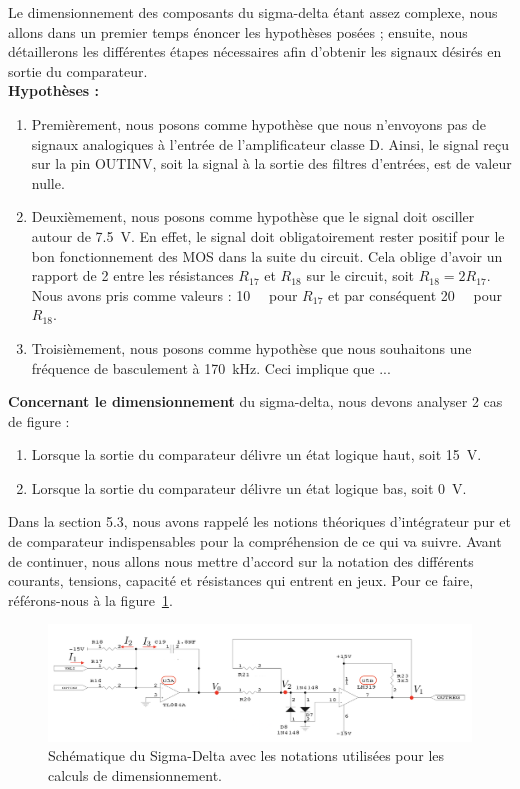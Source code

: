 \documentclass[10pt, oneside, a4paper]{article}
\begin{document}
Le dimensionnement des composants du sigma-delta étant assez complexe, nous allons dans un premier temps énoncer les hypothèses posées ; ensuite, nous détaillerons les différentes étapes nécessaires afin d'obtenir les signaux désirés en sortie du comparateur. \\[1ex]
\textbf{Hypothèses :}
\begin{enumerate}
    \item Premièrement, nous posons comme hypothèse que nous n'envoyons pas de signaux
        analogiques à l'entrée de l'amplificateur classe D.
        Ainsi, le signal reçu sur la pin OUTINV, soit la signal à la sortie des filtres
        d'entrées, est de valeur nulle.
    \item Deuxièmement, nous posons comme hypothèse que le signal doit osciller autour
        de \SI{7.5}{\volt}.
        En effet, le signal doit obligatoirement rester positif pour le bon fonctionnement
        des MOS dans la suite du circuit.
        Cela oblige d'avoir un rapport de 2 entre les résistances $R_{17}$ et $R_{18}$ sur
        le circuit, soit $R_{18} = 2R_{17}$.
        Nous avons pris comme valeurs : \SI{10}{\kilo\Omega} pour $R_{17}$ et par
        conséquent \SI{20}{\kilo\Omega} pour $R_{18}$.
    \item Troisièmement, nous posons comme hypothèse que nous souhaitons une fréquence de
        basculement à \SI{170}{\kilo\hertz}.
        Ceci implique que ...
\end{enumerate}

\noindent\textbf{Concernant le dimensionnement} du sigma-delta, nous devons analyser 2 cas de figure : 
\begin{enumerate}
\item Lorsque la sortie du comparateur délivre un état logique haut, soit \SI{15}{\volt}.
\item Lorsque la sortie du comparateur délivre un état logique bas, soit \SI{0}{\volt}.
\end{enumerate}


Dans la section 5.3, nous avons rappelé les notions théoriques d'intégrateur pur et de comparateur indispensables pour la compréhension de ce qui va suivre. Avant de continuer, nous allons nous mettre d'accord sur la notation des différents courants, tensions, capacité et résistances qui entrent en jeux. Pour ce faire, référons-nous à la figure~\ref{fig:notation}. \\
\begin{figure}[!ht]
    \centering
    \includegraphics[width=\textwidth]{image/Sigma_Delta_Notation.png}
    \caption{Schématique du Sigma-Delta avec les notations utilisées pour les calculs de dimensionnement.}
    \label{fig:notation}
\end{figure}
\end{document}
